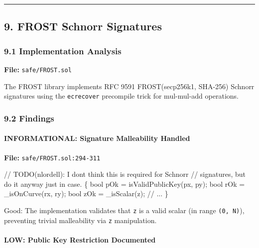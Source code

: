\documentclass[
]{article}
\newenvironment{Shaded}{}{}
\newcommand{\NormalTok}[1]{#1}
\begin{document}
\begin{center}\rule{0.5\linewidth}{0.5pt}\end{center}

\subsection{9. FROST Schnorr
Signatures}\label{9-frost-schnorr-signatures}

\subsubsection{9.1 Implementation
Analysis}\label{91-implementation-analysis}

\textbf{File:} \texttt{safe/FROST.sol}

The FROST library implements RFC 9591 FROST(secp256k1, SHA-256) Schnorr
signatures using the \texttt{ecrecover} precompile trick for mul-mul-add
operations.

\subsubsection{9.2 Findings}\label{92-findings}

\paragraph{INFORMATIONAL: Signature Malleability
Handled}\label{informational-signature-malleability-handled}

\textbf{File:} \texttt{safe/FROST.sol:294-311}

\begin{Shaded}
\begin{Highlighting}[]
\NormalTok{// TODO(nlordell): I don\textquotesingle{}t think this is required for Schnorr}
\NormalTok{// signatures, but do it anyway just in case.}
\NormalTok{\{}
\NormalTok{    bool pOk = isValidPublicKey(px, py);}
\NormalTok{    bool rOk = \_isOnCurve(rx, ry);}
\NormalTok{    bool zOk = \_isScalar(z);}
\NormalTok{    // ...}
\NormalTok{\}}
\end{Highlighting}
\end{Shaded}

Good: The implementation validates that \texttt{z} is a valid scalar (in
range \texttt{(0,\ N)}), preventing trivial malleability via \texttt{z}
manipulation.

\paragraph{LOW: Public Key Restriction
Documented}\label{low-public-key-restriction-documented}
\end{document}
